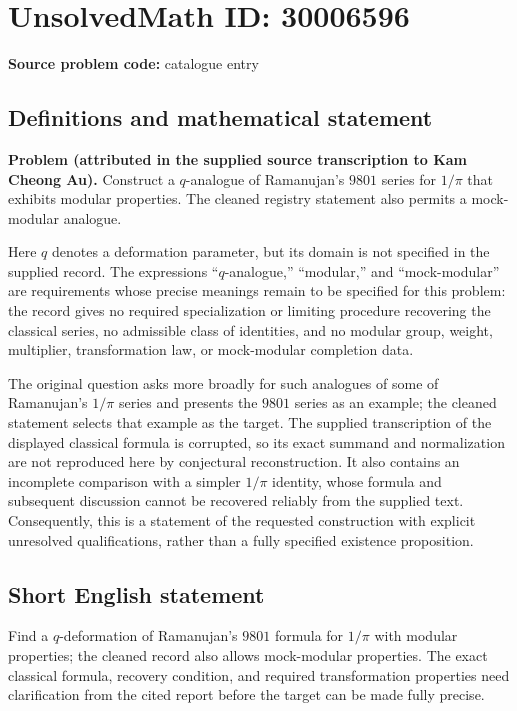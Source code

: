 \documentclass[11pt]{article}
\begin{document}
\section*{UnsolvedMath ID: 30006596}
\textbf{Source problem code:} catalogue entry
\subsection{Definitions and mathematical statement}
\textbf{Problem (attributed in the supplied source transcription to Kam Cheong Au).} Construct a \(q\)-analogue of Ramanujan's \(9801\) series for \(1/\pi\) that exhibits modular properties. The cleaned registry statement also permits a mock-modular analogue.

Here \(q\) denotes a deformation parameter, but its domain is not specified in the supplied record. The expressions ``\(q\)-analogue,'' ``modular,'' and ``mock-modular'' are requirements whose precise meanings remain to be specified for this problem: the record gives no required specialization or limiting procedure recovering the classical series, no admissible class of identities, and no modular group, weight, multiplier, transformation law, or mock-modular completion data.

The original question asks more broadly for such analogues of some of Ramanujan's \(1/\pi\) series and presents the \(9801\) series as an example; the cleaned statement selects that example as the target. The supplied transcription of the displayed classical formula is corrupted, so its exact summand and normalization are not reproduced here by conjectural reconstruction. It also contains an incomplete comparison with a simpler \(1/\pi\) identity, whose formula and subsequent discussion cannot be recovered reliably from the supplied text. Consequently, this is a statement of the requested construction with explicit unresolved qualifications, rather than a fully specified existence proposition.
\subsection{Short English statement}
Find a \(q\)-deformation of Ramanujan's \(9801\) formula for \(1/\pi\) with modular properties; the cleaned record also allows mock-modular properties. The exact classical formula, recovery condition, and required transformation properties need clarification from the cited report before the target can be made fully precise.
\end{document}
